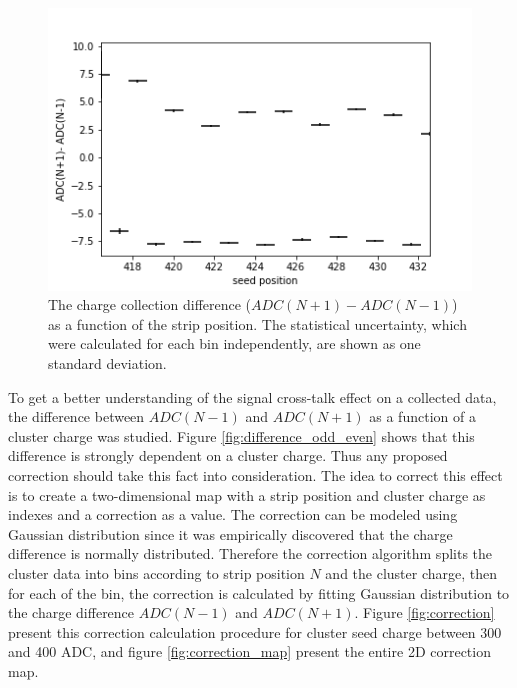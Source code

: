 \begin{figure}[htb]
\centering
\includegraphics[scale=0.5]{figures/eta/profile_0deg.png}
\caption{The charge collection difference ($ADC(N+1) - ADC(N-1)$) as a function of the strip position. The statistical uncertainty, which were calculated for each bin independently, are shown as one standard deviation. }
\label{fig:charge asymmetry profile}
\end{figure}

To get a better understanding of the signal cross-talk effect on a collected data, the difference between $ADC(N-1)$ and $ADC(N+1)$ as a function of a cluster charge was studied. Figure \ref{fig:difference_odd_even} shows that this difference is strongly dependent on a cluster charge. Thus any proposed correction should take this fact into consideration.  The idea to correct this effect is to create a two-dimensional map with a strip position and cluster charge as indexes and a correction as a value. The correction can be modeled using Gaussian distribution since it was empirically discovered that the charge difference is normally distributed.
Therefore the correction algorithm splits the cluster data into bins according to strip position $N$ and the cluster charge, then for each of the bin, the correction is calculated by fitting Gaussian distribution to the charge difference  $ADC(N-1)$ and $ADC(N+1)$. 
Figure \ref{fig:correction} present this correction calculation procedure for cluster seed charge between 300 and 400 ADC, and figure \ref{fig:correction_map} present the entire 2D correction map. 

